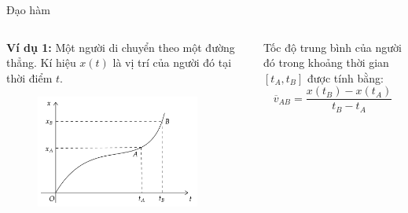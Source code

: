     \begin{frame}{Đạo hàm}
\begin{columns}
    \begin{column}{0.5\textwidth}
\textbf{Ví dụ 1:} Một người di chuyển theo một đường thẳng. Kí hiệu \(x(t)\) là vị trí của người đó tại thời điểm \(t\).
\begin{figure}
    \centering
    \includegraphics[width=0.9\textwidth]{Slides/figure/toc do trung binh.png}
\end{figure}
\end{column}
    \begin{column}{0.5\textwidth}
Tốc độ trung bình của người đó trong khoảng thời gian \([t_A, t_B]\) được tính bằng:
\begin{equation}
    \overline{v}_{AB}=\dfrac{x(t_B)-x(t_A)}{t_B-t_A}
\end{equation}
\end{column}
\end{columns}
\end{frame}

